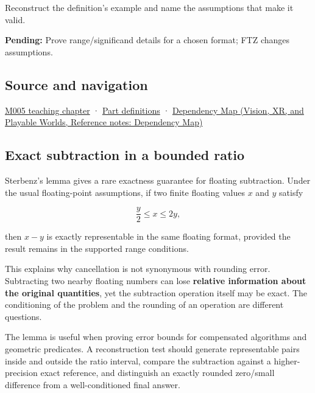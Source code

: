 Reconstruct the definition's example and name the assumptions that make it valid.

\textbf{Pending:} Prove range/significand details for a chosen format; FTZ changes assumptions.

\subsection{Source and navigation}\label{appendix-399b7ad53f39-source-and-navigation}

\hyperref[01-foundations-i-ch001-when-arithmetic-meets-uncertainty]{M005 teaching chapter} · \hyperref[appendix-fd090d982a15-m005---parts-77-88]{Part definitions} · \href{../07-Vision-XR-and-Playable-Worlds/main.pdf\#nameddest=appendix-4ad47bdd269a}{Dependency Map (Vision, XR, and Playable Worlds, Reference notes: Dependency Map)}

\subsection{Exact subtraction in a bounded ratio}\label{appendix-399b7ad53f39-exact-subtraction-in-a-bounded-ratio}

Sterbenz's lemma gives a rare exactness guarantee for floating subtraction. Under the usual floating-point assumptions, if two finite floating values \(x\) and \(y\) satisfy

\[
\frac{y}{2} \le x \le 2y,
\]

then \(x-y\) is exactly representable in the same floating format, provided the result remains in the supported range conditions.

This explains why cancellation is not synonymous with rounding error. Subtracting two nearby floating numbers can lose \textbf{relative information about the original quantities}, yet the subtraction operation itself may be exact. The conditioning of the problem and the rounding of an operation are different questions.

The lemma is useful when proving error bounds for compensated algorithms and geometric predicates. A reconstruction test should generate representable pairs inside and outside the ratio interval, compare the subtraction against a higher-precision exact reference, and distinguish an exactly rounded zero/small difference from a well-conditioned final answer.
